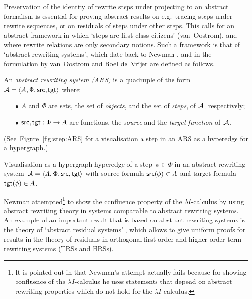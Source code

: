 \documentclass[envcountsame,runningheads]{llncs}
\newcommand{\pairlft}{{\langle}}
\newcommand{\pairrgt}{{\rangle}}
\newcommand{\pairsep}{{,\,}\nix}
\newcommand{\pairstr}[1]{\pairlft#1\pairrgt}
\newcommand{\pair}[2]{\pairstr{#1\pairsep#2}}
\newcommand{\triple}[2]{\pair{#1\pairsep#2}}
\newcommand{\quadruple}[2]{\triple{#1\pairsep#2}}
\newcommand{\sfunin}{{:}}
\newcommand{\funin}{\mathrel{\sfunin}}
\newcommand{\nix}{}
\newcommand{\funap}[2]{#1(#2)}
\newcommand{\aobjects}{A}
\newcommand{\asteps}{\Phi}
\newcommand{\astep}{\phi}
\newcommand{\ssrc}{{\sf src}}
\newcommand{\stgt}{{\sf tgt}}
\newcommand{\src}{\funap{\ssrc}}
\newcommand{\tgt}{\funap{\stgt}}
\newcommand{\aARS}{{\cal A}}
\begin{document}
Preservation of the identity of rewrite steps under projecting to an 
abstract formalism is essential for proving abstract results on e.g.\
tracing steps under rewrite sequences, or on residuals of steps under other steps. 
This calls for an abstract framework in which `steps are first-class citizens'
(van~Oostrom), and where rewrite relations are only secondary notions. 
Such a framework is that of `abstract rewriting systems',
which date back to Newman \cite{newm:1942}, and in the formulation
by van~Oostrom and Roel de~Vrijer \cite{oost:vrij:2002,terese:2003}
are defined as follows.


\begin{samepage}
\begin{definition}\normalfont
  \label{def:absrewsys}
An \emph{abstract rewriting system (ARS)} is 
  a quadruple of the form 
  $ \aARS = \quadruple{\aobjects}{\asteps}{\ssrc}{\stgt}$ 
where:
\begin{itemize}
\item[$\bullet$] $\aobjects$ and $\asteps$ are sets, 
     the set of \emph{objects}, and the set of \emph{steps}, of $\aARS$,
     respectively;
\vspace{0.75ex}
\item[$\bullet$] $ \ssrc, \stgt \funin \Phi \to A $ are functions,
    the {\em source\/} and the {\em target function\/} of~$\aARS$.
\end{itemize}
(See~Figure~\ref{fig:step:ARS} for a visualisation a step in an ARS
   as a hyperedge for a hypergraph.)
\end{definition}
\end{samepage}   


\begin{Figure}[t]
\begin{center}
\scalebox{0.5}{}
\end{center}
\caption{\label{fig:step:ARS}Visualisation as a hypergraph hyperedge of
    a step~$\astep\in\asteps$ in an abstract rewriting system~$ \aARS = \quadruple{\aobjects}{\asteps}{\ssrc}{\stgt}$
    with source formula $\src{\astep}\in\aobjects$
    and target formula $\tgt{\astep}\in\aobjects$.}
\end{Figure}


Newman \cite{newm:1942} attempted\footnote{It is pointed out in \cite[cf.\ Rem.~6.14, (ii)]{oost:vrij:2002} 
            that Newman's attempt actually fails because for showing
            confluence of the $\lambda I$-calculus he uses
            statements that depend on abstract rewriting
            properties which do not hold for the $\lambda I$-calculus.} 
to show the confluence property of the
$\lambda I$-calculus by using abstract rewriting theory in systems
comparable to abstract rewriting systems.
An example of an important result that is based on abstract rewriting systems
is the theory of `abstract residual systems' \cite[Ch.~8]{terese:2003},
which allows to give uniform proofs for results 
in the theory of residuals
in orthogonal first-order and higher-order term rewriting systems (TRSs and HRSs).  
\end{document}
